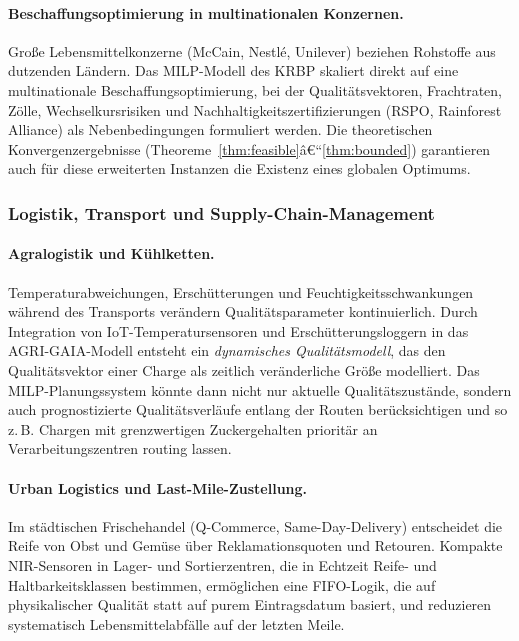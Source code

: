﻿\documentclass[12pt,a4paper]{article}
\theoremstyle{plain}
\theoremstyle{definition}
\begin{document}
	\paragraph{Beschaffungsoptimierung in multinationalen Konzernen.}
	Große Lebensmittelkonzerne (McCain, Nestlé, Unilever) beziehen
	Rohstoffe aus dutzenden Ländern. Das MILP-Modell des KRBP skaliert
	direkt auf eine multinationale Beschaffungsoptimierung, bei der
	Qualitätsvektoren, Frachtraten, Zölle, Wechselkursrisiken und
	Nachhaltigkeitszertifizierungen (RSPO, Rainforest Alliance) als
	Nebenbedingungen formuliert werden. Die theoretischen Konvergenzergebnisse
	(Theoreme~\ref{thm:feasible}â€“\ref{thm:bounded}) garantieren auch
	für diese erweiterten Instanzen die Existenz eines globalen Optimums.

	\subsubsection{Logistik, Transport und Supply-Chain-Management}

	\paragraph{Agralogistik und Kühlketten.}
	Temperaturabweichungen, Erschütterungen und Feuchtigkeitsschwankungen
	während des Transports verändern Qualitätsparameter kontinuierlich.
	Durch Integration von IoT-Temperatursensoren und Erschütterungsloggern
	in das AGRI-GAIA-Modell entsteht ein \emph{dynamisches Qualitätsmodell},
	das den Qualitätsvektor einer Charge als zeitlich veränderliche Größe
	modelliert. Das MILP-Planungssystem könnte dann nicht nur aktuelle
	Qualitätszustände, sondern auch prognostizierte Qualitätsverläufe
	entlang der Routen berücksichtigen und so z.\,B. Chargen mit
	grenzwertigen Zuckergehalten prioritär an Verarbeitungszentren
	routing lassen.

	\paragraph{Urban Logistics und Last-Mile-Zustellung.}
	Im städtischen Frischehandel (Q-Com\-merce, Same-Day-Delivery) entscheidet
	die Reife von Obst und Gemüse über Reklamationsquoten und Retouren.
	Kompakte NIR-Sensoren in Lager- und Sortierzentren, die in Echtzeit
	Reife- und Haltbarkeitsklassen bestimmen, ermöglichen eine
	FIFO-Logik, die auf physikalischer Qualität statt auf purem
	Eintragsdatum basiert, und reduzieren systematisch Lebensmittelabfälle
	auf der letzten Meile.
\end{document}
